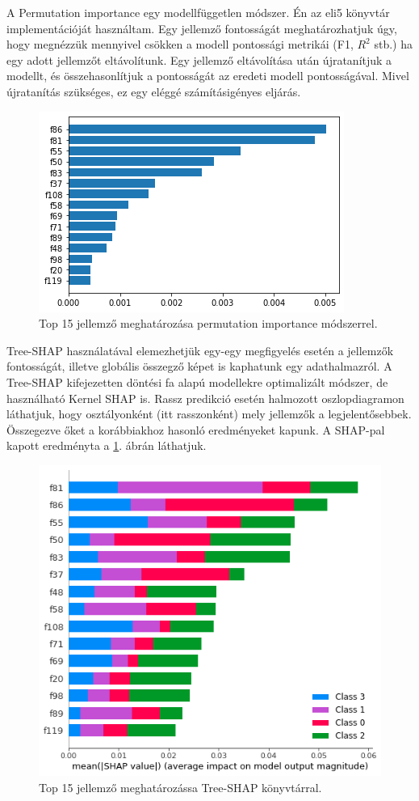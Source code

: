 A Permutation importance egy modellfüggetlen módszer. Én az eli5 \cite{eli5_2016} könyvtár implementációját használtam. Egy jellemző fontosságát meghatározhatjuk úgy, hogy megnézzük mennyivel csökken a modell pontossági metrikái (F1, $R^2$ stb.) ha egy adott jellemzőt eltávolítunk. Egy jellemző eltávolítása után újratanítjuk a modellt, és összehasonlítjuk a pontosságát az eredeti modell pontosságával. Mivel újratanítás szükséges, ez egy eléggé számításigényes eljárás.

\begin{figure}[ht]
	\centering
	\includegraphics[width=0.7\columnwidth]{figures/imp_eli.png}
	\caption{Top 15 jellemző meghatározása permutation importance módszerrel.}
\end{figure}

Tree-SHAP \cite{treeshap2020} használatával elemezhetjük egy-egy megfigyelés esetén a jellemzők fontosságát, illetve globális összegző képet is kaphatunk egy adathalmazról. A Tree-SHAP kifejezetten döntési fa alapú modellekre optimalizált módszer, de használható Kernel SHAP is. Rassz predikció esetén halmozott oszlopdiagramon láthatjuk, hogy osztályonként (itt rasszonként) mely jellemzők a legjelentősebbek. Összegezve őket a korábbiakhoz hasonló eredményeket kapunk. A SHAP-pal kapott eredményta a \ref{fig:shap}. ábrán láthatjuk.

\begin{figure}[ht]
	\centering
	\includegraphics[width=0.7\columnwidth]{figures/imp_shap.png}
	\caption{Top 15 jellemző meghatározássa Tree-SHAP könyvtárral.}
	\label{fig:shap}
\end{figure}


